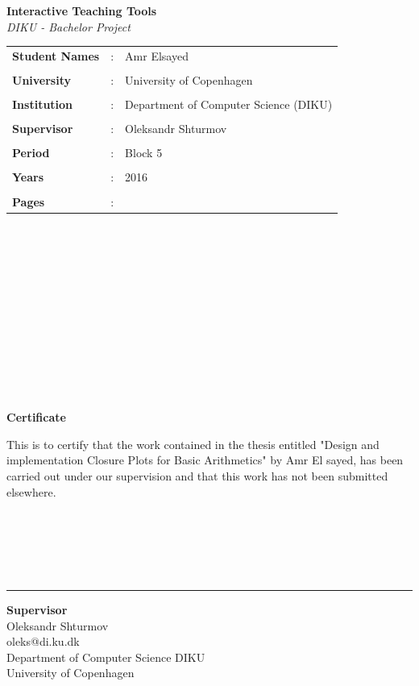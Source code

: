 \documentclass[11pt]{article}
\begin{document}
\clearpage\maketitle
\thispagestyle{empty}
\newpage
\begin{center}{\huge\textbf{Interactive Teaching Tools}}\\\textit{DIKU - Bachelor Project}\end{center}
\begin{tabular}{l l l }
\textbf{Student Names} &: &Amr Elsayed\\\\
\textbf{University} &:& University of Copenhagen\\\\
    \textbf{Institution} &:& Department of Computer Science (DIKU)\\\\
\textbf{Supervisor} &:& Oleksandr Shturmov\\\\
\textbf{Period} &:& Block 5\\\\
\textbf{Years} &:& 2016\\\\
\textbf{Pages} &:& \\
\end{tabular}
\\\\\\\\\\\\\\\\\\\\\\
\begin{center}{\huge\textbf{Certificate}}\end{center}

This is to certify that the work contained in the thesis entitled "Design and implementation Closure Plots for Basic Arithmetics" by Amr El sayed, has been carried out under our supervision and that this work has not been submitted elsewhere.\\\\\\\\\\\\
\begin{center}\noindent\rule{8cm}{0.4pt}%
  \begin{center}
    \textbf{Supervisor}\\
    Oleksandr Shturmov \\
    oleks@di.ku.dk \\
    Department of Computer Science DIKU \\
    University of Copenhagen
  \end{center}
\end{center}
\end{document}
